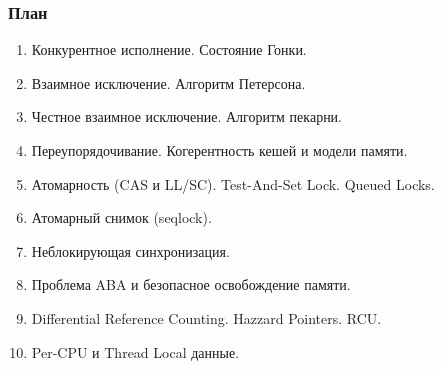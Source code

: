 \begin{frame}
\frametitle{План}

\begin{enumerate}
  \item Конкурентное исполнение. Состояние Гонки.
  \item Взаимное исключение. Алгоритм Петерсона.
  \item Честное взаимное исключение. Алгоритм пекарни.
  \item Переупорядочивание. Когерентность кешей и модели памяти.
  \item Атомарность (CAS и LL/SC). Test-And-Set Lock. Queued Locks.
  \item Атомарный снимок (seqlock).
  \item Неблокирующая синхронизация.
  \item Проблема ABA и безопасное освобождение памяти.
  \item Differential Reference Counting. Hazzard Pointers. RCU.
  \item Per-CPU и Thread Local данные.
\end{enumerate}
\end{frame}
